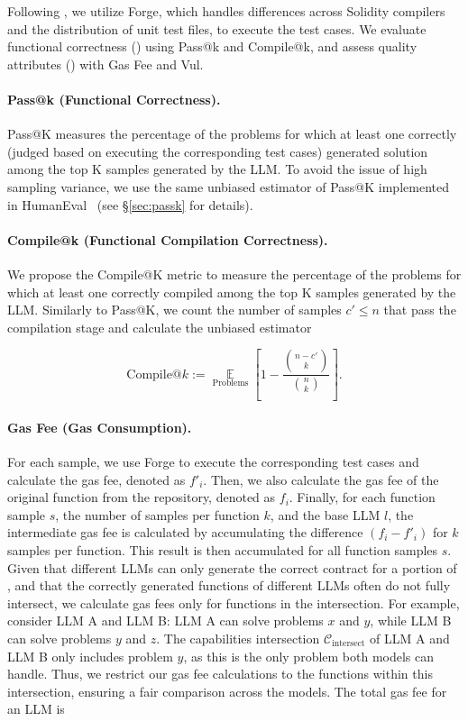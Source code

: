 Following \citet{britikov2024soltg}, we utilize Forge, which handles differences across Solidity compilers and the distribution of unit test files, to execute the test cases. We evaluate functional correctness () using Pass@k and Compile@k, and assess quality attributes () with Gas Fee and Vul.

\paragraph{Pass@k (Functional Correctness).}
Pass@K measures the percentage of the problems for which at least one correctly (judged based on executing the corresponding test cases) generated solution among the top K samples generated by the LLM. 
To avoid the issue of high sampling variance, we use the same unbiased estimator of Pass@K implemented in HumanEval~\cite{chen2021evaluating} (see \S\ref{sec:passk} for details).


\noindent
\paragraph{Compile@k (Functional Compilation Correctness).}
We propose the Compile@K metric to measure the percentage of the problems for which at least one correctly compiled among the top K samples generated by the LLM. 
Similarly to Pass@K, we count the number of samples \( c' \leq n \) that pass the compilation stage and calculate the unbiased estimator


\begin{equation}
\text{Compile@}k := \mathop{\mathbb{E}}\limits_{\text{Problems}} \left[ 1 - \frac{\binom{n-c'}{k}}{\binom{n}{k}} \right].
\end{equation}


\noindent
\paragraph{Gas Fee (Gas Consumption).}
For each sample, we use Forge to execute the corresponding test cases and calculate the gas fee, denoted as \( f'_i \). 
Then, we also calculate the gas fee of the original function from the repository, denoted as \( f_i \).
Finally, for each function sample \( s \), the number of samples per function \( k \), and the base LLM \( l \), the intermediate gas fee is calculated by accumulating the difference \( (f_i - f'_i) \) for \( k \) samples per function.
This result is then accumulated for all function samples \( s \). 
Given that different LLMs can only generate the correct contract for a portion of \mytitle, and that the correctly generated functions of different LLMs often do not fully intersect, we calculate gas fees only for functions in the intersection. 
For example, consider LLM A and LLM B: LLM A can solve problems \( x \) and \( y \), while LLM B can solve problems \( y \) and \( z \). 
The capabilities intersection \( \mathcal{C}_{\text{intersect}} \) of LLM A and LLM B only includes problem \( y \), as this is the only problem both models can handle. 
Thus, we restrict our gas fee calculations to the functions within this intersection, ensuring a fair comparison across the models. 
The total gas fee for an LLM is


